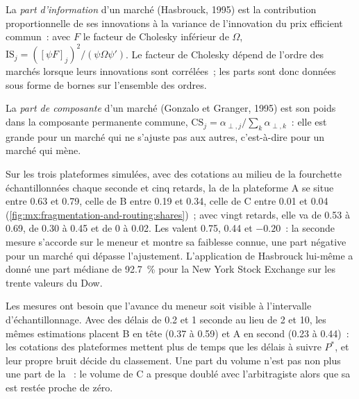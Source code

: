 \begin{definition}\label{def:mx:fragmentation-and-routing:is}
La \emph{part d'information} d'un marché (Hasbrouck, 1995) est la contribution proportionnelle de ses innovations à la variance de
l'innovation du prix efficient commun~: avec $F$ le facteur de Cholesky inférieur de $\Omega$, $\mathrm{IS}_j=([\psi F]_j)^2/(\psi\Omega\psi')$. Le
facteur de Cholesky dépend de l'ordre des marchés lorsque leurs innovations sont corrélées~; les parts sont donc données sous forme de bornes sur l'ensemble des ordres.
\end{definition}

\begin{definition}\label{def:mx:fragmentation-and-routing:cs}
La \emph{part de composante} d'un marché (Gonzalo et Granger, 1995) est son poids dans la composante permanente commune,
$\mathrm{CS}_j=\alpha_{\perp,j}/\sum_k\alpha_{\perp,k}$~: elle est grande pour un marché qui ne s'ajuste pas aux autres, c'est-à-dire pour un marché qui mène.
\end{definition}

\label{lst:mx:fragmentation-and-routing:is}

Sur les trois plateformes simulées, avec des cotations au milieu de la fourchette échantillonnées chaque seconde et cinq retards, la  de la plateforme A se situe entre 0.63 et 0.79, celle de B entre
0.19 et 0.34, celle de C entre 0.01 et 0.04 (\cref{fig:mx:fragmentation-and-routing:shares})~; avec vingt retards, elle va de 0.53 à 0.69, de 0.30 à 0.45 et de 0 à 0.02. Les
 valent 0.75, 0.44 et $-0.20$~: la seconde mesure s'accorde sur le meneur et montre sa faiblesse connue, une part négative pour un marché qui
dépasse l'ajustement. L'application de Hasbrouck lui-même a donné une part médiane de 92.7~\% pour la New York Stock Exchange sur les trente valeurs du Dow.

Les mesures ont besoin que l'avance du meneur soit visible à l'intervalle d'échantillonnage. Avec des délais de 0.2 et 1 seconde au lieu de 2 et 10, les mêmes
estimations placent B en tête (0.37 à 0.59) et A en second (0.23 à 0.44)~: les cotations des plateformes mettent plus de temps que les délais à suivre $P^\ast$, et leur
propre bruit décide du classement. Une part du volume n'est pas non plus une part de la ~: le volume de C a presque doublé avec l'arbitragiste alors que
sa  est restée proche de zéro.

